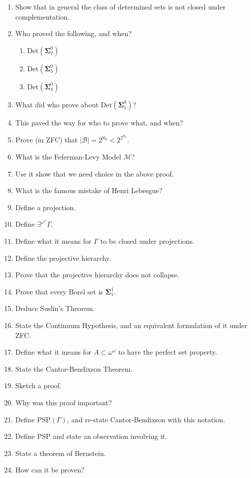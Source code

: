 \documentclass[]{article}
\newcommand{\om}{\omega}
\newcommand{\bosig}{\bm{\Sigma}}
\newcommand{\Det}{\textrm{Det}}
\newcommand{\eom}{\exists^{\om^\om}}
\newcommand{\psp}{\textrm{PSP}}
\begin{document}
\begin{enumerate}
    \item Show that in general the class of determined sets is not closed under complementation.
    \item Who proved the following, and when?
    \begin{enumerate}
        \item $\Det(\bosig^0_2)$
        \item $\Det(\bosig^0_3)$
        \item $\Det(\bosig^0_4)$
    \end{enumerate}
    \item What did who prove about $\Det(\bosig^0_5)$?
    \item This paved the way for who to prove what, and when?
    \item Prove (in ZFC) that $|\mathcal{B}| = 2^{\aleph_0} < 2^{2^{\aleph_0}}$.
    \item What is the Feferman-Levy Model $\mathcal{M}$?
    \item Use it show that we need choice in the above proof.
    \item What is the famous mistake of Henri Lebesgue?
    \item Define a projection.
    \item Define $\eom\Gamma$.
    \item Define what it means for $\Gamma$ to be closed under projections.
    \item Define the projective hierarchy.
    \item Prove that the projective hierarchy does not collapse.
    \item Prove that every Borel set is $\bosig^1_1$.
    \item Deduce Suslin's Theorem.
    \item State the Continuum Hypothesis, and an equivalent formulation of it under ZFC.
    \item Define what it means for $A\subset \om^\om$ to have the perfect set property.
    \item State the Cantor-Bendixson Theorem.
    \item Sketch a proof.
    \item Why was this proof important?
    \item Define $\psp(\Gamma)$, and re-state Cantor-Bendixson with this notation.
    \item Define $\psp$ and state an observation involving it.
    \item State a theorem of Bernstein.
    \item How can it be proven?

\end{enumerate}
\end{document}
